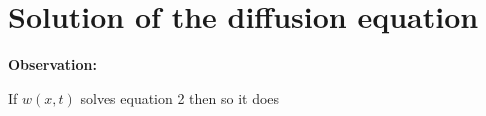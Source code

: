 



\section{Solution of the diffusion equation}\label{sec:solution_of_the_diffusion_equation} %
\textbf{Observation:}

If $w(x,t)$ solves equation 2 then so it does  
